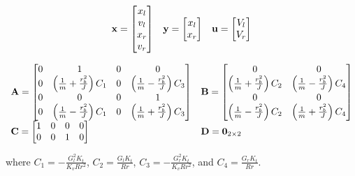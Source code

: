 \begin{equation*}
  \begin{array}{ccc}
    \mathbf{x} =
    \begin{bmatrix}
      x_l \\
      v_l \\
      x_r \\
      v_r
    \end{bmatrix} &
    \mathbf{y} =
    \begin{bmatrix}
      x_l \\
      x_r
    \end{bmatrix} &
    \mathbf{u} =
    \begin{bmatrix}
      V_l \\
      V_r
    \end{bmatrix}
  \end{array}
\end{equation*}

\begin{equation*}
  \begin{array}{ll}
    \mathbf{A} =
    \begin{bmatrix}
      0 & 1 & 0 & 0 \\
      0 & \left(\frac{1}{m} + \frac{r_b^2}{J}\right) C_1 & 0 & \left(\frac{1}{m} - \frac{r_b^2}{J}\right) C_3 \\
      0 & 0 & 0 & 1 \\
      0 & \left(\frac{1}{m} - \frac{r_b^2}{J}\right) C_1 & 0 & \left(\frac{1}{m} + \frac{r_b^2}{J}\right) C_3
    \end{bmatrix} &
    \mathbf{B} =
    \begin{bmatrix}
      0 & 0 \\
      \left(\frac{1}{m} + \frac{r_b^2}{J}\right) C_2 & \left(\frac{1}{m} - \frac{r_b^2}{J}\right) C_4 \\
      0 & 0 \\
      \left(\frac{1}{m} - \frac{r_b^2}{J}\right) C_2 & \left(\frac{1}{m} + \frac{r_b^2}{J}\right) C_4
    \end{bmatrix} \\
    \mathbf{C} =
    \begin{bmatrix}
      1 & 0 & 0 & 0 \\
      0 & 0 & 1 & 0 \\
    \end{bmatrix} &
    \mathbf{D} = \mathbf{0}_{2 \times 2}
  \end{array}
\end{equation*}

where $C_1 = -\frac{G_l^2 K_t}{K_v R r^2}$, $C_2 = \frac{G_l K_t}{Rr}$,
$C_3 = -\frac{G_r^2 K_t}{K_v R r^2}$, and $C_4 = \frac{G_r K_t}{Rr}$.

